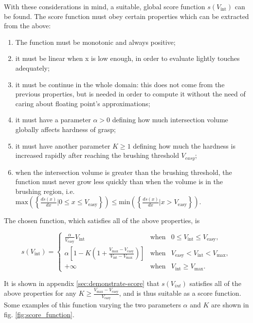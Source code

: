 With these considerations in mind, a suitable, global score function $s(V_{\text{int}})$
can be found. The score function must obey certain properties which can be
extracted from the above:

\begin{enumerate}
  \item{The function must be monotonic and always positive;}
  \item{it must be linear when x is low enough, in order to evaluate
    lightly touches adequately;}
  \item{it must be continue in the whole domain: this does not come
      from the previous properties, but is needed in order to compute it without
    the need of caring about floating point's approximations;}
  \item{it must have a parameter $\alpha>0$ defining how much
    intersection volume globally affects hardness of grasp;}
  \item{it must have another parameter $K\geq1$ defining how much the hardness is
    increased rapidly after reaching the brushing threshold $V_{easy}$;}
  \item{when the intersection volume is greater than the brushing threshold, the
      function
    must never grow less quickly than when the volume is in the brushing
    region, i.e. $\text{max}\left( \left\{ \frac{ds(x)}{dx} | 0 \leq
    x \leq V_{\text{easy}} \right\} \right) \leq \text{min}\left( \left\{
  \frac{ds(x)}{dx} | x > V_{\text{easy}}\right\} \right)$.}
\end{enumerate}

The chosen function, which satisfies all of the above properties, is

\begin{equation} \label{eqn:score-function}
  s(V_{\text{int}})=\left\{
    \begin{array}{lcr}
      \frac{\alpha}{V_{\text{easy}}} V_{\text{int}} & \text{when} & 0 \leq V_{\text{int}} \leq V_{\text{easy}}, \\
      \alpha
      \left[1-K\left(1+\frac{V_{\text{max}}-V_{\text{easy}}}{V_{\text{int}}-V_{\text{max}}}\right)\right]
      & \text{when} &  V_{\text{easy}} < V_{\text{int}} < V_{\text{max}}, \\
      +\infty & \text{when} & V_{\text{int}} \geq V_{\text{max}}.
    \end{array}
  \right.
\end{equation}

It is shown in appendix \ref{sec:demonstrate-score} that $s(V_{int})$ satisfies all
of the above properties for any $K\geq \frac{V_{\text{max}}-V_{\text{easy}}}{V_{\text{easy}}}$, and is thus suitable as a score
function. Some examples of this function varying the two parameters $\alpha$ and
$K$ are shown in fig. \ref{fig:score_function}.

